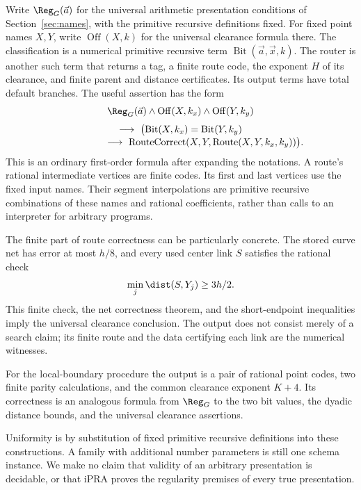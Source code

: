 Write $\Reg_G(\vec a)$ for the universal arithmetic presentation
conditions of Section~\ref{sec:names}, with the primitive recursive
definitions fixed. For fixed point names $X,Y$, write
$\operatorname{Off}(X,k)$ for the universal clearance formula
there. The classification is a numerical primitive recursive term
$\operatorname{Bit}(\vec a,\vec x,k)$.
The router is another such term that returns a tag, a finite route
code, the exponent $H$ of its clearance, and finite parent and
distance certificates. Its output terms have total default branches.
The useful assertion has the form
\begin{gather*}
 \Reg_G(\vec a)\wedge
 \operatorname{Off}(X,k_x)\wedge\operatorname{Off}(Y,k_y)
 \\[1mm]
 \longrightarrow\ \bigl(\operatorname{Bit}(X,k_x)=\operatorname{Bit}(Y,k_y)
       \\[-1mm]\hspace{18mm}\longrightarrow\
       \operatorname{RouteCorrect}
          (X,Y,\operatorname{Route}(X,Y,k_x,k_y))\bigr).
\end{gather*}
This is an ordinary first-order formula after expanding the
notations. A route's rational intermediate vertices are finite codes.
Its first and last vertices use the fixed input names.
Their segment interpolations are primitive recursive combinations
of these names and rational coefficients, rather than calls to an
interpreter for arbitrary programs.

The finite part of route correctness can be particularly concrete.
The stored curve net has error at most $h/8$, and every used
center link $S$ satisfies the rational check
\[
                \min_j\dist(S,Y_j)\ge3h/2.
\]
This finite check, the net correctness theorem, and the short-endpoint
inequalities imply the universal clearance conclusion. The output
does not consist merely of a search claim; its finite route and
the data certifying each link are the numerical witnesses.

For the local-boundary procedure the output is a pair of rational
point codes, two finite parity calculations, and the common
clearance exponent $K+4$. Its correctness is an analogous formula
from $\Reg_G$ to the two bit values, the dyadic distance bounds,
and the universal clearance assertions.

Uniformity is by substitution of fixed primitive recursive
definitions into these constructions. A family with additional
number parameters is still one schema instance. We make no
claim that validity of an arbitrary presentation is decidable,
or that iPRA proves the regularity premises of every true
presentation.


